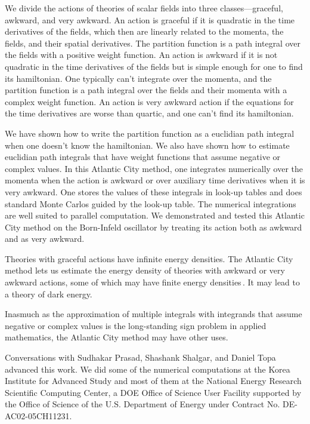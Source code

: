 \documentclass[prd,preprint,floatfix,showpacs]{revtex4-1}
\begin{document}
We divide the actions 
of theories of scalar fields
into three classes---graceful, 
awkward, and very awkward.
An action is graceful if it is quadratic
in the time derivatives of the fields,
which then are 
linearly related to the momenta,
the fields, and
their spatial derivatives.
The partition function is
a path integral over the fields
with a positive weight function.
An action is awkward if it
is not quadratic
in the time derivatives of the fields but is simple
enough for one to find its hamiltonian.
One typically can't integrate over the momenta,
and the partition function is a path integral
over the fields and their momenta
with a complex weight function.
An action is very awkward action if 
the equations for the time derivatives 
are worse than quartic,
and one can't find its hamiltonian.
\par
We have shown how to write 
the partition function as a
euclidian path integral 
when one doesn't know
the hamiltonian.
We also have shown how
to estimate euclidian path integrals
that have weight functions 
that assume negative or complex values.
In this Atlantic City method,
one integrates numerically
over the momenta when the action
is awkward or over
auxiliary time derivatives
when it is very awkward.
One stores the values of these integrals
in look-up tables
and does standard 
Monte Carlos guided by
the look-up table. 
The numerical integrations
are well suited to parallel computation.
We demonstrated and tested
this Atlantic City method
on the Born-Infeld oscillator
by treating its action both
as awkward and as very awkward.
\par
Theories with graceful actions
have infinite energy densities. 
The Atlantic City method lets us
estimate the energy density
of theories with awkward
or very awkward 
actions, some of which 
may have finite energy 
densities\,\cite{Bender1990, *Cahill2013NA, 
*PhysRevD.88.125014NA}\@.
It may lead
to a theory of dark energy. 
\par 
Inasmuch as the approximation of multiple
integrals with integrands
that assume negative or complex values
is the long-standing sign problem 
in applied mathematics,
the Atlantic City method
may have other uses.


\begin{acknowledgments}
Conversations with 
Sudhakar Prasad, Shashank Shalgar,
and Daniel Topa
advanced this work.  
We did some of the
numerical computations at 
the Korea Institute for Advanced Study
and most of them
at the  National Energy Research Scientific Computing Center, a DOE Office of Science User Facility supported by the Office of Science of the U.S. Department of Energy under Contract 
No. DE-AC02-05CH11231.
\end{acknowledgments}
\end{document}
